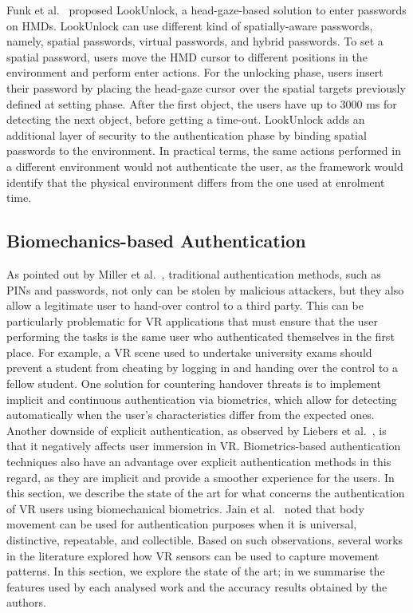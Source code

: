 \documentclass[journal]{IEEEtran}
\begin{document}
Funk et al.~\cite{funk2019} proposed LookUnlock, a head-gaze-based solution to enter passwords on HMDs. LookUnlock can use different kind of spatially-aware passwords, namely, spatial passwords, virtual passwords, and hybrid passwords. To set a spatial password, users move the HMD cursor to different positions in the environment and perform enter actions. For the unlocking phase, users insert their password by placing the head-gaze cursor over the spatial targets previously defined at setting phase. After the first object, the users have up to 3000 ms for detecting the next object, before getting a time-out. LookUnlock adds an additional layer of security to the authentication phase by binding spatial passwords to the environment. In practical terms, the same actions performed in a different environment would not authenticate the user, as the framework would identify that the physical environment differs from the one used at enrolment time. 


\subsection{Biomechanics-based Authentication}
As pointed out by Miller et al.~\cite{miller2021}, traditional authentication methods, such as PINs and passwords, not only can be stolen by malicious attackers, but they also allow a legitimate user to hand-over control to a third party. This can be particularly problematic for VR applications that must ensure that the user performing the tasks is the same user who authenticated themselves in the first place. For example, a VR scene used to undertake university exams should prevent a student from cheating by logging in and handing over the control to a fellow student. One solution for countering handover threats is to implement implicit and continuous authentication via biometrics, which allow for detecting automatically when the user's characteristics differ from the expected ones. 
Another downside of explicit authentication, as observed by Liebers et al.~\cite{liebers2021gaze}, is that it negatively affects user immersion in VR. Biometrics-based authentication techniques also have an advantage over explicit authentication methods in this regard, as they are implicit and provide a smoother experience for the users. In this section, we describe the state of the art for what concerns the authentication of VR users using biomechanical biometrics.  Jain et al.~\cite{jain2004} noted that body movement can be used for authentication purposes when it is universal, distinctive, repeatable, and collectible. Based on such observations, several works in the literature explored how VR sensors can be used to capture movement patterns. In this section, we explore the state of the art; in  we summarise the features used by each analysed work and the accuracy results obtained by the authors.
\end{document}
